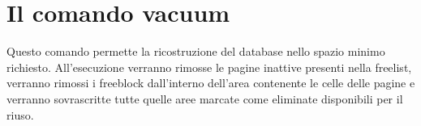 \section{Il comando vacuum}
Questo comando permette la ricostruzione del database nello spazio minimo richiesto. All'esecuzione verranno rimosse le pagine inattive presenti nella freelist, verranno rimossi i freeblock dall'interno dell'area contenente le celle delle pagine e verranno sovrascritte tutte quelle aree marcate come eliminate disponibili per il riuso.

